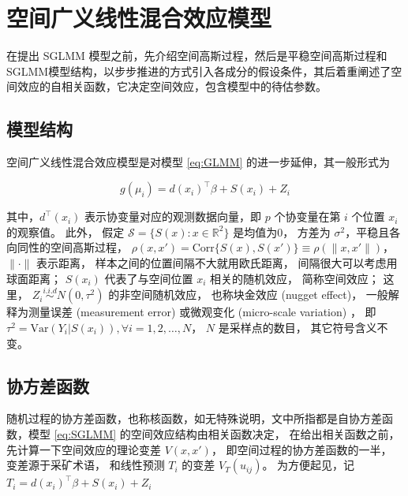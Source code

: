 \documentclass[12pt,a4paper,UTF8,twoside]{book}
\theoremstyle{definition}
\theoremstyle{definition}
\theoremstyle{definition}
\theoremstyle{remark}
\begin{document}
\hypertarget{Spatial-Generalized-linear-mixed-effects-models}{%
\section{空间广义线性混合效应模型}\label{Spatial-Generalized-linear-mixed-effects-models}}

在提出 SGLMM
模型之前，先介绍空间高斯过程，然后是平稳空间高斯过程和SGLMM模型结构，以步步推进的方式引入各成分的假设条件，其后着重阐述了空间效应的自相关函数，它决定空间效应，包含模型中的待估参数。

\hypertarget{intro-sglmm}{%
\subsection{模型结构}\label{intro-sglmm}}

空间广义线性混合效应模型是对模型 \eqref{eq:GLMM}
的进一步延伸，其一般形式为

\begin{equation}
g(\mu_i) = d(x_i)^{\top}\beta + S(x_i) + Z_i \label{eq:SGLMM}
\end{equation}

\noindent 其中，\(d^{\top}(x_i)\) 表示协变量对应的观测数据向量，即 \(p\)
个协变量在第 \(i\) 个位置 \(x_i\) 的观察值。 此外， 假定
\(\mathcal{S} = \{S(x): x \in \mathbb{R}^2\}\) 是均值为0， 方差为
\(\sigma^2\)，平稳且各向同性的空间高斯过程，
\(\rho(x,x') = \mathrm{Corr}\{S(x),S(x')\} \equiv \rho(\|x,x'\|)\)，
\(\|\cdot\|\) 表示距离， 样本之间的位置间隔不大就用欧氏距离，
间隔很大可以考虑用球面距离； \(S(x_i)\) 代表了与空间位置 \(x_i\)
相关的随机效应， 简称空间效应； 这里，
\(Z_i \stackrel{i.i.d}{\sim} N(0,\tau^2)\) 的非空间随机效应，
也称块金效应 (nugget effect)， 一般解释为测量误差 (measurement error)
或微观变化 (micro-scale variation) \citep{Christensen2004}， 即
\(\tau^2=\mathrm{Var}(Y_{i}|S(x_{i})),\forall i = 1,2, \ldots, N\)，
\(N\) 是采样点的数目， 其它符号含义不变。

\hypertarget{covariance-function}{%
\subsection{协方差函数}\label{covariance-function}}

随机过程的协方差函数，也称核函数，如无特殊说明，文中所指都是自协方差函数，模型
\eqref{eq:SGLMM} 的空间效应结构由相关函数决定， 在给出相关函数之前，
先计算一下空间效应的理论变差 \(V(x,x')\)，
即空间过程的协方差函数的一半， 变差源于采矿术语， 和线性预测 \(T_{i}\)
的变差 \(V_{T}(u_{ij})\)。 为方便起见，记
\(T_{i} = d(x_i)^{\top}\beta + S(x_i) + Z_i\)
\end{document}
